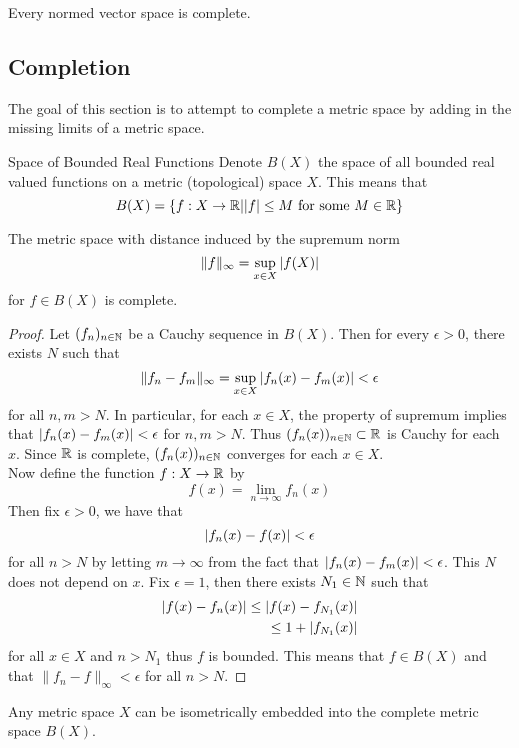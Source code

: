 \documentclass[a4paper]{article}
\begin{document}
\begin{prp}{}{} Every normed vector space is complete. 
\end{prp}

\subsection{Completion}
The goal of this section is to attempt to complete a metric space by adding in the missing limits of a metric space. 

\begin{defn}{Space of Bounded Real Functions}{} Denote $B(X)$ the space of all bounded real valued functions on a metric (topological) space $X$. This means that $$B(X)=\{f:X\to\mathbb{R}|\abs{f}\leq M\text{ for some }M\in\mathbb{R}\}$$
\end{defn}

\begin{prp}{}{} The metric space with distance induced by the supremum norm $$\|f\|_{\infty}=\sup_{x\in X}\abs{f(X)}$$ for $f\in B(X)$ is complete. 
\begin{proof}
Let $(f_n)_{n\in\mathbb{N}}$ be a Cauchy sequence in $B(X)$. Then for every $\epsilon>0$, there exists $N$ such that $$\|f_n-f_m\|_{\infty}=\sup_{x\in X}\abs{f_n(x)-f_m(x)}<\epsilon$$ for all $n,m>N$. In particular, for each $x\in X$, the property of supremum implies that $\abs{f_n(x)-f_m(x)}<\epsilon$ for $n,m>N$. Thus $(f_n(x))_{n\in\mathbb{N}}\subset\mathbb{R}$ is Cauchy for each $x$. Since $\mathbb{R}$ is complete, $(f_n(x))_{n\in\mathbb{N}}$ converges for each $x\in X$. \\
Now define the function $f:X\to\mathbb{R}$ by $$f(x)=\lim_{n\to\infty}f_n(x)$$ Then fix $\epsilon>0$, we have that $$\abs{f_n(x)-f(x)}<\epsilon$$ for all $n>N$ by letting $m\to\infty$ from the fact that $\abs{f_n(x)-f_m(x)}<\epsilon$. This $N$ does not depend on $x$. Fix $\epsilon=1$, then there exists $N_1\in\mathbb{N}$ such that 
\begin{align*}
\abs{f(x)-f_n(x)}\leq\abs{f(x)-f_{N_1}(x)}\\
\leq 1+\abs{f_{N_1}(x)}
\end{align*} for all $x\in X$ and $n>N_1$ thus $f$ is bounded. This means that $f\in B(X)$ and that $\|f_n-f\|_\infty<\epsilon$ for all $n>N$. 
\end{proof}
\end{prp}

\begin{prp}{}{} Any metric space $X$ can be isometrically embedded into the complete metric space $B(X)$. 
\end{prp}
\end{document}

